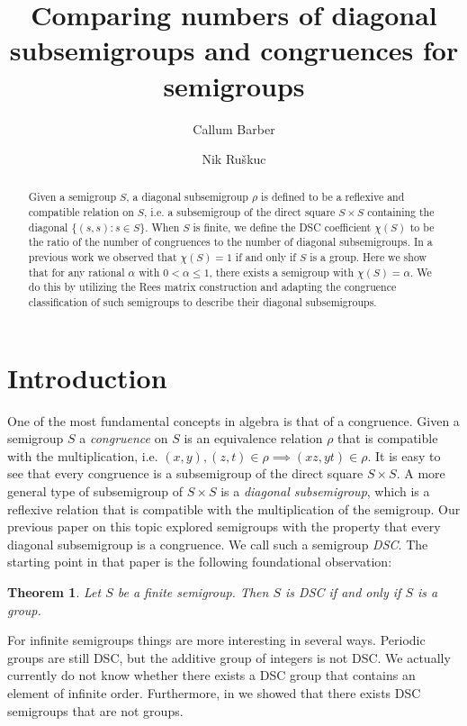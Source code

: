 \documentclass[a4paper, 12pt,reqno]{amsart}
\title[Numbers of Diagonal subsemigroups and congruences]{Comparing numbers of diagonal subsemigroups and congruences for semigroups}
\author[C.\ Barber]{Callum Barber}
\author[N.\ Ru\v{s}kuc]{Nik Ru\v{s}kuc}
\theoremstyle{plain}
\newtheorem{thm}{Theorem}[section]
\theoremstyle{definition}
\theoremstyle{remark}
\begin{document}
\begin{abstract}
    Given a semigroup $S$, a diagonal subsemigroup $\rho$ is defined to be a reflexive and compatible relation on $S$, i.e. a subsemigroup of the direct square $S\times S$ containing the diagonal $\{ (s,s)\colon s\in S\}$.
    When $S$ is finite, we define the DSC coefficient $\chi(S)$ to be the ratio of the number of congruences to the number of diagonal subsemigroups.
    In a previous work we observed that $\chi(S) = 1$ if and only if $S$ is a group.
    Here we show that for any rational $\alpha$ with $0 < \alpha \leq 1$, there exists a semigroup with $\chi(S) = \alpha$.
    We do this by utilizing the Rees matrix construction and adapting the congruence classification of such semigroups to describe their diagonal subsemigroups.
\end{abstract}

\maketitle



\section{Introduction}

One of the most fundamental concepts in algebra is that of a congruence.
Given a semigroup $S$ a \textit{congruence} on $S$ is an equivalence relation $\rho$ that is compatible with the multiplication, i.e. $(x,y),(z,t) \in \rho \implies (xz,yt) \in \rho$.
It is easy to see that every congruence is a subsemigroup of the direct square $S \times S$.
A more general type of subsemigroup of $S\times S$ is a \textit{diagonal subsemigroup}, which is a reflexive relation that is compatible with the multiplication of the semigroup.
Our previous paper on this topic \cite{BARBER_2025} explored semigroups with the property that every diagonal subsemigroup is a congruence.
We call such a semigroup \textit{DSC}.
The starting point in that paper is the following foundational observation:
\begin{thm}
    \label{motivation theorem}
    Let $S$ be a finite semigroup. Then $S$ is DSC  if and only if $S$ is a group.
\end{thm}

For infinite semigroups things are more interesting in several ways.
Periodic groups  are still DSC, but the additive group of integers is not DSC.
We actually currently do not know  whether there exists a DSC group that contains an element of infinite order.
Furthermore, in \cite{BARBER_2025} we showed that there exists DSC semigroups that are not groups.
\end{document}

